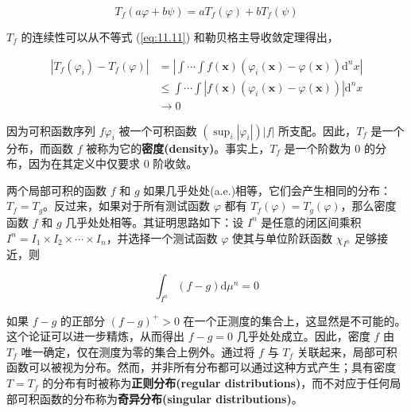 $$
T_f(a \varphi + b \psi) = a T_f(\varphi) + b T_f(\psi)
$$

$T_f$ 的连续性可以从不等式 (\ref{eq:11.11}) 和勒贝格主导收敛定理得出，

$$
\begin{aligned}
\left|T_f(\varphi_i) - T_f(\varphi)\right| &= \left|\int \cdots \int f(\mathbf{x})\left(\varphi_i(\mathbf{x}) - \varphi(\mathbf{x})\right) \mathrm{d}^n x\right| \\
&\leq \int \cdots \int \left|f(\mathbf{x})\left(\varphi_i(\mathbf{x}) - \varphi(\mathbf{x})\right)\right| \mathrm{d}^n x \\
&\to 0
\end{aligned}
$$

因为可积函数序列 $f \varphi_i$ 被一个可积函数
$\left(\sup_i |\varphi_i|\right)|f|$ 所支配。因此，$T_f$
是一个分布，而函数 $f$
被称为它的\textbf{密度(density)}。事实上，$T_f$ 是一个阶数为 0
的分布，因为在其定义中仅要求 0 阶收敛。

两个局部可积的函数 $f$ 和 $g$
如果几乎处处(a.e.)相等，它们会产生相同的分布：$T_f = T_g$。反过来，如果对于所有测试函数
$\varphi$ 都有 $T_f(\varphi) = T_g(\varphi)$，那么密度函数 $f$ 和
$g$ 几乎处处相等。其证明思路如下：设 $I^n$ 是任意的闭区间乘积
$I^n = I_1 \times I_2 \times \cdots \times I_n$，并选择一个测试函数
$\varphi$ 使其与单位阶跃函数 $\chi_{I^n}$ 足够接近，则

$$
\int_{I^n}(f - g) \mathrm{d}\mu^n = 0
$$

如果 $f - g$ 的正部分 $(f - g)^+ > 0$
在一个正测度的集合上，这显然是不可能的。这个论证可以进一步精炼，从而得出
$f - g = 0$ 几乎处处成立。因此，密度 $f$ 由 $T_f$
唯一确定，仅在测度为零的集合上例外。通过将 $f$ 与 $T_f$
关联起来，局部可积函数可以被视为分布。然而，并非所有分布都可以通过这种方式产生；具有密度
$T = T_f$ 的分布有时被称为\textbf{正则分布(regular distributions)}，而不对应于任何局部可积函数的分布称为\textbf{奇异分布(singular distributions)}。

